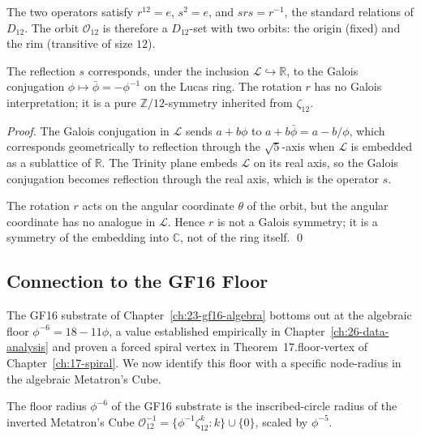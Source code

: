 The two operators satisfy $r^{12} = e$, $s^{2} = e$, and
$s r s = r^{-1}$, the standard relations of $D_{12}$. The orbit
$\mathcal{O}_{12}$ is therefore a $D_{12}$-set with two orbits: the
origin (fixed) and the rim (transitive of size $12$).

\begin{lemma}
\label{lem:13-galois}
The reflection $s$ corresponds, under the inclusion $\mathcal{L}
\hookrightarrow \mathbb{R}$, to the Galois conjugation
$\phi \mapsto \bar\phi = -\phi^{-1}$ on the Lucas ring. The
rotation $r$ has no Galois interpretation; it is a pure
$\mathbb{Z}/12$-symmetry inherited from $\zeta_{12}$.
\end{lemma}

\begin{proof}
The Galois conjugation in $\mathcal{L}$ sends $a + b\phi$ to
$a + b\bar\phi = a - b/\phi$, which corresponds geometrically to
reflection through the $\sqrt{5}$-axis when $\mathcal{L}$ is
embedded as a sublattice of $\mathbb{R}$. The Trinity plane embeds
$\mathcal{L}$ on its real axis, so the Galois conjugation becomes
reflection through the real axis, which is the operator $s$.

The rotation $r$ acts on the angular coordinate $\theta$ of the
orbit, but the angular coordinate has no analogue in $\mathcal{L}$.
Hence $r$ is not a Galois symmetry; it is a symmetry of the
embedding into $\mathbb{C}$, not of the ring itself. \qed
\end{proof}

\subsection{Connection to the GF16 Floor}
\label{fa_13:sec:13-gf16}

The GF16 substrate of Chapter~\ref{ch:23-gf16-algebra} bottoms out
at the algebraic floor $\phi^{-6} = 18 - 11\phi$, a value
established empirically in Chapter~\ref{ch:26-data-analysis} and
proven a forced spiral vertex in Theorem~17.floor-vertex of
Chapter~\ref{ch:17-spiral}. We now identify this floor with a
specific node-radius in the algebraic Metatron's Cube.

\begin{lemma}
\label{lem:13-gf16-floor}
The floor radius $\phi^{-6}$ of the GF16 substrate is the
inscribed-circle radius of the inverted Metatron's Cube
$\mathcal{O}_{12}^{-1} = \{\phi^{-1} \zeta_{12}^{k} : k\} \cup
\{0\}$, scaled by $\phi^{-5}$.
\end{lemma}

